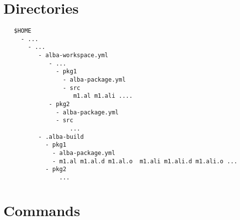 \section{Directories}

{\small
\begin{verbatim}
   $HOME
     - ...
       - ...
          - alba-workspace.yml
             - ...
               - pkg1
                 - alba-package.yml
                 - src
                    m1.al m1.ali ....
             - pkg2
               - alba-package.yml
               - src
                   ...
          - .alba-build
            - pkg1
              - alba-package.yml
              - m1.al m1.al.d m1.al.o  m1.ali m1.ali.d m1.ali.o ...
            - pkg2
                ...
\end{verbatim}
}


\section{Commands}


